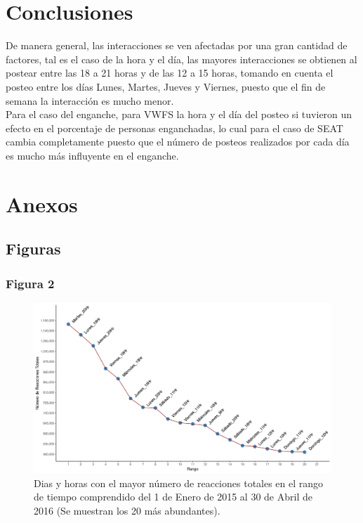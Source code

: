 \documentclass[a4paper,10pt]{article}
\begin{document}
\section{Conclusiones}
De manera general, las interacciones se ven afectadas por una gran 
cantidad de factores, tal es el caso de la hora y el día, 
las mayores interacciones se obtienen 
al postear entre las 18 a  21 horas y de las 12 a 15 horas, 
tomando en cuenta el posteo entre los días Lunes, Martes, Jueves y Viernes,
puesto que el fin de semana la interacción es mucho menor.\\
Para el caso del enganche, para VWFS la hora y el día
del posteo si tuvieron un efecto en el porcentaje de personas  enganchadas,
lo cual para el caso de SEAT cambia completamente
puesto que el número de posteos realizados por cada día
es mucho más influyente en el enganche.



\section{Anexos}
\subsection{Figuras}
\subsubsection{Figura 2}
\begin{figure}[H]
  \begin{center}
   \includegraphics[width=.85\textwidth]{imagenes/figura2.png}
   \captionsetup{width=.80\textwidth}
   \caption{\centering Dias y horas con el mayor número de reacciones totales en el rango de tiempo
   comprendido del 1 de Enero de 2015 al 30 de Abril de 2016 (Se muestran los  20 más abundantes).}
  \end{center} 
\end{figure}
\end{document}
